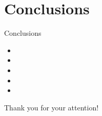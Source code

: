 \section{Conclusions}

\begin{frame}{Conclusions}
    \begin{itemize}
        \item 
        \item[]
        \item 
        \item[]
        \item 
    \end{itemize}
\end{frame}

\begin{frame}

    \begin{center}
        \Huge Thank you for your attention!
    \end{center}
\end{frame}
